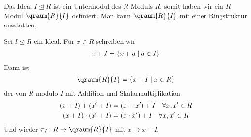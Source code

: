 \begin{remark}
	Das Ideal $I\unlhd R$ ist ein Untermodul des $R$-Moduls $R$, somit haben wir ein $R$-Modul $\qraum{R}{I}$ definiert. Man kann $\qraum{R}{I}$ mit einer Ringstruktur ausstatten.
\end{remark}

\begin{definition}[Quotientenring]
	Sei $I\unlhd R$ ein Ideal. Für $x\in R$ schreiben wir 
	\begin{align}
		x+I=\{x+a\mid a\in I\}\notag
	\end{align}
	Dann ist
	\begin{align}
		\qraum{R}{I}=\{x+I\mid x\in R\}\notag
	\end{align}
	der  von $R$ modulo $I$ mit Addition und Skalarmultiplikation
	\begin{align}
		(x+I)+(x'+I) &= (x+x')+I\quad\forall x,x'\in R \notag \\
		(x+I)\cdot (x'+I) &= (x\cdot x')+I\quad\forall x,x'\in R\notag
	\end{align}
	Und wieder $\pi_I:R\to\qraum{R}{I}$ mit $x\mapsto x+I$.
\end{definition}


